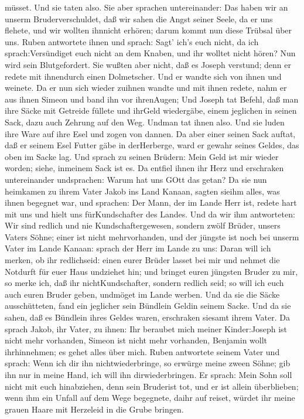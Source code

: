 müsset. Und sie taten also.  Sie aber sprachen
untereinander: Das haben wir an unserm Bruderverschuldet, daß wir sahen
die Angst seiner Seele, da er uns flehete, und wir wollten ihnnicht
erhören; darum kommt nun diese Trübsal über uns.  Ruben
antwortete ihnen und sprach: Sagt' ich's euch nicht, da ich
sprach:Versündiget euch nicht an dem Knaben, und ihr wolltet nicht
hören? Nun wird sein Blutgefordert.  Sie wußten aber nicht,
daß es Joseph verstund; denn er redete mit ihnendurch einen Dolmetscher.
 Und er wandte sich von ihnen und weinete. Da er nun sich
wieder zuihnen wandte und mit ihnen redete, nahm er aus ihnen Simeon und
band ihn vor ihrenAugen;  Und Joseph tat Befehl, daß man
ihre Säcke mit Getreide füllete und ihrGeld wiedergäbe, einem jeglichen
in seinen Sack, dazu auch Zehrung auf den Weg. Undman tat ihnen also.
 Und sie luden ihre Ware auf ihre Esel und zogen von
dannen.  Da aber einer seinen Sack auftat, daß er seinem
Esel Futter gäbe in derHerberge, ward er gewahr seines Geldes, das oben
im Sacke lag.  Und sprach zu seinen Brüdern: Mein Geld ist
mir wieder worden; siehe, inmeinem Sack ist es. Da entfiel ihnen ihr
Herz und erschraken untereinander undsprachen: Warum hat uns GOtt das
getan?  Da sie nun heimkamen zu ihrem Vater Jakob ins Land
Kanaan, sagten sieihm alles, was ihnen begegnet war, und sprachen:
 Der Mann, der im Lande Herr ist, redete hart mit uns und
hielt uns fürKundschafter des Landes.  Und da wir ihm
antworteten: Wir sind redlich und nie Kundschaftergewesen, 
sondern zwölf Brüder, unsers Vaters Söhne; einer ist nicht
mehrvorhanden, und der jüngste ist noch bei unserm Vater im Lande
Kanaan:  sprach der Herr im Lande zu uns: Daran will ich
merken, ob ihr redlichseid: einen eurer Brüder lasset bei mir und nehmet
die Notdurft für euer Haus undziehet hin;  und bringet
euren jüngsten Bruder zu mir, so merke ich, daß ihr nichtKundschafter,
sondern redlich seid; so will ich euch auch euren Bruder geben, undmöget
im Lande werben.  Und da sie die Säcke ausschütteten, fand
ein jeglicher sein Bündlein Geldin seinem Sacke. Und da sie sahen, daß
es Bündlein ihres Geldes waren, erschraken siesamt ihrem Vater.
 Da sprach Jakob, ihr Vater, zu ihnen: Ihr beraubet mich
meiner Kinder:Joseph ist nicht mehr vorhanden, Simeon ist nicht mehr
vorhanden, Benjamin wollt ihrhinnehmen; es gehet alles über mich.
 Ruben antwortete seinem Vater und sprach: Wenn ich dir ihn
nichtwiederbringe, so erwürge meine zween Söhne; gib ihn nur in meine
Hand, ich will ihn dirwiederbringen.  Er sprach: Mein Sohn
soll nicht mit euch hinabziehen, denn sein Bruderist tot, und er ist
allein überblieben; wenn ihm ein Unfall auf dem Wege begegnete, daihr
auf reiset, würdet ihr meine grauen Haare mit Herzeleid in die Grube
bringen.

